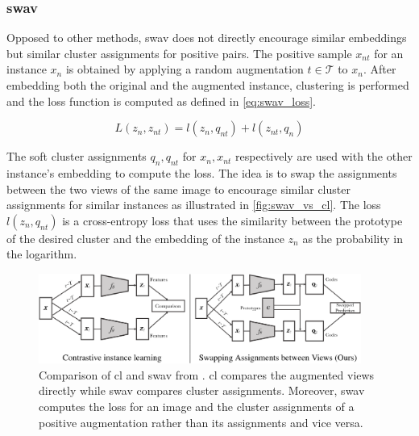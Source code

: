 \subsubsection{\acl{swav}}\label{subsubsec:SwAV}

Opposed to other methods, \ac{swav} does not directly encourage similar embeddings but similar 
cluster assignments for positive pairs.
The positive sample $x_{nt}$ for an instance $x_n$ is obtained by applying a 
random augmentation $t \in \mathcal{T}$ to $x_n$.
After embedding both the original and the augmented instance, clustering is performed and 
the loss function is computed as defined in \eqref{eq:swav_loss}.

\begin{equation}
    L(z_n, z_{nt}) = l(z_n, q_{nt}) + l(z_{nt}, q_n)
    \label{eq:swav_loss}
\end{equation}

The soft cluster assignments $q_n, q_{nt}$ for $x_n, x_{nt}$ respectively 
are used with the other instance's embedding to compute the loss.
The idea is to swap the assignments between the two views of the same image to encourage 
similar cluster assignments for similar instances as illustrated in \autoref{fig:swav_vs_cl}.
The loss $l(z_n, q_{nt})$ is a cross-entropy loss that uses the similarity between the prototype 
of the desired cluster and the embedding of the instance $z_n$ as the probability in the logarithm.

\begin{figure}[!htb] %
    \centering
    \includegraphics[width=300pt]{images/SwAV_vs_CL.png}
    \caption{Comparison of \ac{cl} and \ac{swav} from \citet{swav_2020}.
    \ac{cl} compares the augmented views directly while 
    \ac{swav} compares cluster assignments.
    Moreover, \ac{swav} computes the loss for an image and the cluster assignments of a positive augmentation 
    rather than its assignments and vice versa.}
    \label{fig:swav_vs_cl}
\end{figure}

